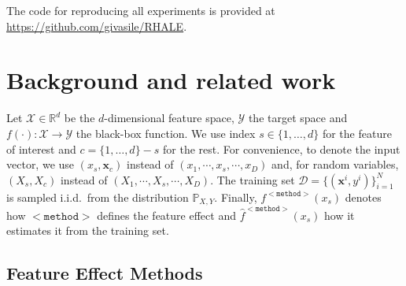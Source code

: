 \documentclass{ecai}  %
\newcommand{\xc}{\mathbf{x}_c}
\newcommand{\xb}{\mathbf{x}}
\begin{document}
The code for reproducing all experiments is provided at \href{https://github.com/givasile/RHALE}{https://github.com/givasile/RHALE}.

\section{Background and related work}
\label{sec:background}

Let \(\mathcal{X} \in \mathbb{R}^d\) be the \(d\)-dimensional feature
space, \(\mathcal{Y}\) the target space and
\(f(\cdot) : \mathcal{X} \rightarrow \mathcal{Y}\) the black-box
function.  We use index \(s \in \{1, \ldots, d\}\) for the feature of
interest and \(c = \{1, \ldots, d\} - s\) for the rest.  For
convenience, to denote the input vector, we use \((x_s, \xc)\) instead
of \((x_1, \cdots , x_s, \cdots, x_D)\) and, for random variables,
\((X_s, X_c)\) instead of \((X_1, \cdots , X_s, \cdots, X_D)\).  The
training set \(\mathcal{D} = \{(\xb^i, y^i)\}_{i=1}^N\) is sampled
i.i.d.\ from the distribution \(\mathbb{P}_{X,Y}\).  Finally,
\(f^{\mathtt{<method>}}(x_s)\) denotes how \(\mathtt{<method>}\)
defines the feature effect and \(\hat{f}^{\mathtt{<method>}}(x_s)\)
how it estimates it from the training set.

\subsection{Feature Effect Methods}
\label{subsec:feat-effect-meth}
\end{document}
